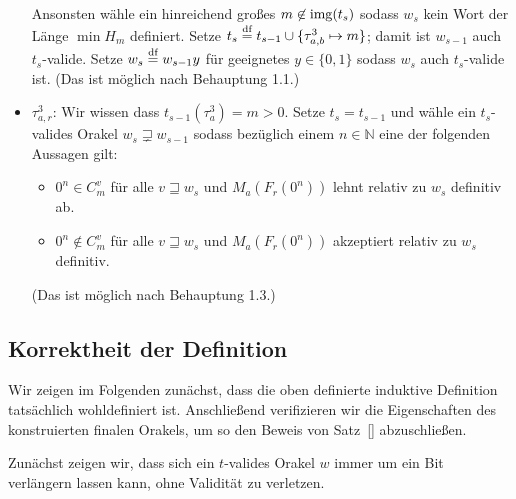\begin{itemize}
        Ansonsten wähle ein hinreichend großes $m\not\in \operatorname{img}(t_s)$ sodass $w_s$ kein Wort der Länge $\min H_m$ definiert. Setze $t_s\stackrel{\text{df}}{=} t_{s-1}\cup \{ \tau^3_{a,b}\mapsto m \}$; damit ist $w_{s-1}$ auch $t_s$-valide. Setze $w_s\stackrel{\text{df}}{=} w_{s-1}y$ für geeignetes $y\in\{0,1\}$ sodass $w_s$ auch $t_s$-valide ist. (Das ist möglich nach Behauptung 1.1.)

    \item $\tau^3_{a,r}$: Wir wissen dass $t_{s-1}(\tau^3_{a})=m>0$. Setze $t_s=t_{s-1}$ und wähle ein $t_s$-valides Orakel $w_s\sqsupsetneq w_{s-1}$ sodass bezüglich einem $n\in\mathbb N$ eine der folgenden Aussagen gilt:
        \begin{itemize}[nosep,endpenalty=10000]
            \item $0^n\in C_m^v$ für alle $v\sqsupseteq w_s$ und $M_a(F_r(0^n))$ lehnt relativ zu $w_s$ definitiv ab.
            \item $0^n\not\in C_m^v$ für alle $v\sqsupseteq w_s$ und $M_a(F_r(0^n))$ akzeptiert relativ zu $w_s$ definitiv.
        \end{itemize} (Das ist möglich nach Behauptung 1.3.)
\end{itemize}

\subsection*{Korrektheit der Definition}

Wir zeigen im Folgenden zunächst, dass die oben definierte induktive Definition tatsächlich wohldefiniert ist.
Anschließend verifizieren wir die Eigenschaften des konstruierten finalen Orakels, um so den Beweis von Satz~\ref{} abzuschließen.

Zunächst zeigen wir, dass sich ein $t$-valides Orakel $w$ immer um ein Bit verlängern lassen kann, ohne Validität zu verletzen.

